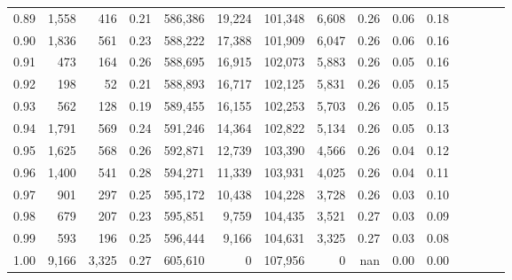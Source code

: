 \begin{tabular}{rrrcrrrrrrrrrrr}
0.89 &   1,558 &    416 &                                       0.21 &  586,386 &   19,224 &  101,348 &    6,608 &  0.26 &  0.06 &                         0.18 \\
0.90 &   1,836 &    561 &                                       0.23 &  588,222 &   17,388 &  101,909 &    6,047 &  0.26 &  0.06 &                         0.16 \\
0.91 &     473 &    164 &                                       0.26 &  588,695 &   16,915 &  102,073 &    5,883 &  0.26 &  0.05 &                         0.16 \\
0.92 &     198 &     52 &                                       0.21 &  588,893 &   16,717 &  102,125 &    5,831 &  0.26 &  0.05 &                         0.15 \\
0.93 &     562 &    128 &                                       0.19 &  589,455 &   16,155 &  102,253 &    5,703 &  0.26 &  0.05 &                         0.15 \\
0.94 &   1,791 &    569 &                                       0.24 &  591,246 &   14,364 &  102,822 &    5,134 &  0.26 &  0.05 &                         0.13 \\
0.95 &   1,625 &    568 &                                       0.26 &  592,871 &   12,739 &  103,390 &    4,566 &  0.26 &  0.04 &                         0.12 \\
0.96 &   1,400 &    541 &                                       0.28 &  594,271 &   11,339 &  103,931 &    4,025 &  0.26 &  0.04 &                         0.11 \\
0.97 &     901 &    297 &                                       0.25 &  595,172 &   10,438 &  104,228 &    3,728 &  0.26 &  0.03 &                         0.10 \\
0.98 &     679 &    207 &                                       0.23 &  595,851 &    9,759 &  104,435 &    3,521 &  0.27 &  0.03 &                         0.09 \\
0.99 &     593 &    196 &                                       0.25 &  596,444 &    9,166 &  104,631 &    3,325 &  0.27 &  0.03 &                         0.08 \\
1.00 &   9,166 &  3,325 &                                       0.27 &  605,610 &        0 &  107,956 &        0 &   nan &  0.00 &                         0.00 \\
\bottomrule
\end{tabular}
